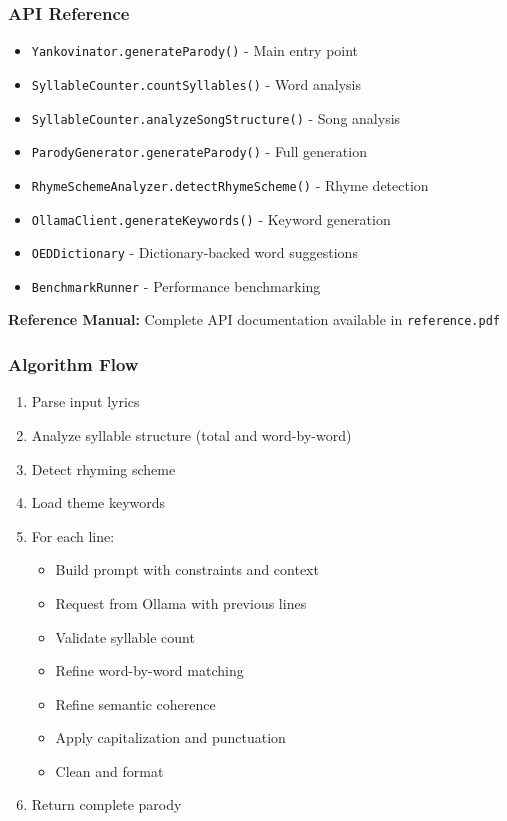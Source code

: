 \documentclass[aspectratio=169]{beamer}
\begin{document}
\begin{frame}
\frametitle{API Reference}
\begin{itemize}
    \item \texttt{Yankovinator.generateParody()} - Main entry point
    \item \texttt{SyllableCounter.countSyllables()} - Word analysis
    \item \texttt{SyllableCounter.analyzeSongStructure()} - Song analysis
    \item \texttt{ParodyGenerator.generateParody()} - Full generation
    \item \texttt{RhymeSchemeAnalyzer.detectRhymeScheme()} - Rhyme detection
    \item \texttt{OllamaClient.generateKeywords()} - Keyword generation
    \item \texttt{OEDDictionary} - Dictionary-backed word suggestions
    \item \texttt{BenchmarkRunner} - Performance benchmarking
\end{itemize}

\textbf{Reference Manual:} Complete API documentation available in \texttt{reference.pdf}
\end{frame}

\begin{frame}
\frametitle{Algorithm Flow}
\begin{enumerate}
    \item Parse input lyrics
    \item Analyze syllable structure (total and word-by-word)
    \item Detect rhyming scheme
    \item Load theme keywords
    \item For each line:
    \begin{itemize}
        \item Build prompt with constraints and context
        \item Request from Ollama with previous lines
        \item Validate syllable count
        \item Refine word-by-word matching
        \item Refine semantic coherence
        \item Apply capitalization and punctuation
        \item Clean and format
    \end{itemize}
    \item Return complete parody
\end{enumerate}
\end{frame}
\end{document}
